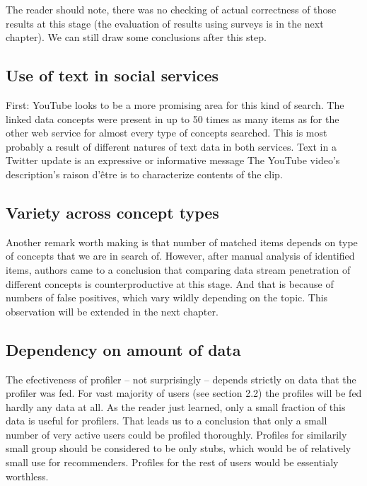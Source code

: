 The reader should note, there was no checking of actual correctness of those results at
this stage (the evaluation of results using surveys is in the next chapter). We
can still draw some conclusions after this step.

\subsection{Use of text in social services}
First: YouTube looks to be a more promising area for this kind of search. The
linked data concepts were present in up to 50 times as many items as for the other
web service for almost every type of concepts searched. This is most probably a
result of different natures of text data in both services.  Text in a Twitter
update is an expressive or informative message The YouTube video's description's
raison d'être is to characterize contents of the clip.

\subsection{Variety across concept types}
Another remark worth making is that number of matched items depends on type of
concepts that we are in search of. However, after manual analysis of identified
items, authors came to a conclusion that comparing data stream penetration of
different concepts is counterproductive at this stage. And that is because of
numbers of false positives, which vary wildly depending on the topic. This
observation will be extended in the next chapter.

\subsection{Dependency on amount of data}
The efectiveness of profiler -- not surprisingly -- depends strictly on data
that the profiler was fed. For vast majority of users (see section 2.2) the
profiles will be fed hardly any data at all. As the reader just learned, only a
small fraction of this data is useful for profilers. That leads us to a
conclusion that only a small number of very active users could be profiled
thoroughly. Profiles for similarily small group should be considered to be only
stubs, which would be of relatively small use for recommenders. Profiles for the
rest of users would be essentialy worthless.
